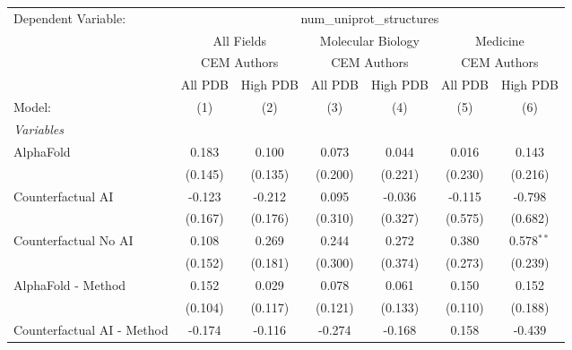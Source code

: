 \begingroup
\centering
\begin{tabular}{lcccccc}
   \tabularnewline \midrule \midrule
   Dependent Variable: & \multicolumn{6}{c}{num\_uniprot\_structures}\\
 & \multicolumn{2}{c}{All Fields} & \multicolumn{2}{c}{Molecular Biology} & \multicolumn{2}{c}{Medicine} \\
\cmidrule(lr){2-3} \cmidrule(lr){4-5} \cmidrule(lr){6-7}
 & \multicolumn{2}{c}{CEM Authors} & \multicolumn{2}{c}{CEM Authors} & \multicolumn{2}{c}{CEM Authors} \\
\cmidrule(lr){2-3} \cmidrule(lr){4-5} \cmidrule(lr){6-7}
 & \multicolumn{1}{c}{All PDB} & \multicolumn{1}{c}{High PDB} & \multicolumn{1}{c}{All PDB} & \multicolumn{1}{c}{High PDB} & \multicolumn{1}{c}{All PDB} & \multicolumn{1}{c}{High PDB} \\
\cmidrule(lr){2-2} \cmidrule(lr){3-3} \cmidrule(lr){4-4} \cmidrule(lr){5-5} \cmidrule(lr){6-6} \cmidrule(lr){7-7}
   Model:                                                     & (1)     & (2)     & (3)     & (4)     & (5)     & (6)\\  
   \midrule
   \emph{Variables}\\
   AlphaFold                                                  & 0.183   & 0.100   & 0.073   & 0.044   & 0.016   & 0.143\\   
                                                              & (0.145) & (0.135) & (0.200) & (0.221) & (0.230) & (0.216)\\   
   Counterfactual AI                                          & -0.123  & -0.212  & 0.095   & -0.036  & -0.115  & -0.798\\   
                                                              & (0.167) & (0.176) & (0.310) & (0.327) & (0.575) & (0.682)\\   
   Counterfactual No AI                                       & 0.108   & 0.269   & 0.244   & 0.272   & 0.380   & 0.578$^{**}$\\   
                                                              & (0.152) & (0.181) & (0.300) & (0.374) & (0.273) & (0.239)\\   
   AlphaFold - Method                                         & 0.152   & 0.029   & 0.078   & 0.061   & 0.150   & 0.152\\   
                                                              & (0.104) & (0.117) & (0.121) & (0.133) & (0.110) & (0.188)\\   
   Counterfactual AI - Method                                 & -0.174  & -0.116  & -0.274  & -0.168  & 0.158   & -0.439\\   

\end{tabular}
